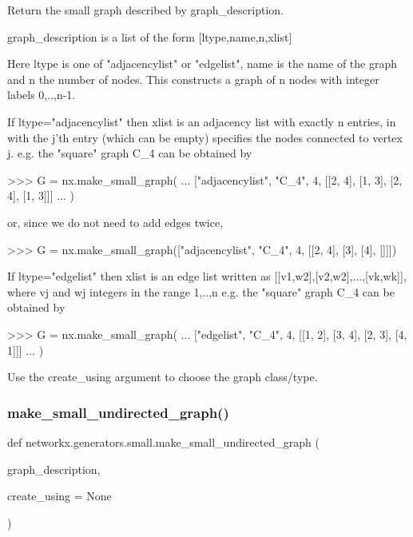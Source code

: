 \begin{DoxyVerb}Return the small graph described by graph_description.

graph_description is a list of the form [ltype,name,n,xlist]

Here ltype is one of "adjacencylist" or "edgelist",
name is the name of the graph and n the number of nodes.
This constructs a graph of n nodes with integer labels 0,..,n-1.

If ltype="adjacencylist"  then xlist is an adjacency list
with exactly n entries, in with the j'th entry (which can be empty)
specifies the nodes connected to vertex j.
e.g. the "square" graph C_4 can be obtained by

>>> G = nx.make_small_graph(
...     ["adjacencylist", "C_4", 4, [[2, 4], [1, 3], [2, 4], [1, 3]]]
... )

or, since we do not need to add edges twice,

>>> G = nx.make_small_graph(["adjacencylist", "C_4", 4, [[2, 4], [3], [4], []]])

If ltype="edgelist" then xlist is an edge list
written as [[v1,w2],[v2,w2],...,[vk,wk]],
where vj and wj integers in the range 1,..,n
e.g. the "square" graph C_4 can be obtained by

>>> G = nx.make_small_graph(
...     ["edgelist", "C_4", 4, [[1, 2], [3, 4], [2, 3], [4, 1]]]
... )

Use the create_using argument to choose the graph class/type.
\end{DoxyVerb}
 \mbox{\label{namespacenetworkx_1_1generators_1_1small_a62acd86678337571139400132a2c92fc}} 
\subsubsection{\texorpdfstring{make\+\_\+small\+\_\+undirected\+\_\+graph()}{make\_small\_undirected\_graph()}}
{\footnotesize\ttfamily def networkx.\+generators.\+small.\+make\+\_\+small\+\_\+undirected\+\_\+graph (\begin{DoxyParamCaption}\item[{}]{graph\+\_\+description,  }\item[{}]{create\+\_\+using = {\ttfamily None} }\end{DoxyParamCaption})}


